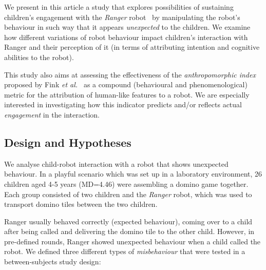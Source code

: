\documentclass{sig-alternate}
\newcommand{\etal}{{\textit{et al.~}}}
\begin{document}
We present in this article a study that explores possibilities of sustaining
children's engagement with the \emph{Ranger} robot~\cite{mondada2014ranger} by
manipulating the robot's behaviour in such way that it appears
\textit{unexpected} to the children. We examine how different variations of
robot behaviour impact children's interaction with Ranger and their perception of
it (in terms of attributing intention and cognitive abilities to the robot).

This study also aims at assessing the effectiveness of the \emph{anthropomorphic
index} proposed by Fink \etal\cite{fink2014dynamics} as a compound (behavioural
and phenomenological) metric for the attribution of human-like features to
a robot. We are especially interested in investigating how this indicator predicts
and/or reflects actual \emph{engagement} in the interaction.

\subsection{Design and Hypotheses}

We analyse child-robot interaction with a robot that shows unexpected behaviour.
In a playful scenario which was set up in a laboratory environment, 26 children
aged 4-5 years (MD=4.46) were assembling a domino game together. Each group
consisted of two children and the \emph{Ranger} robot, which was used to
transport domino tiles between the two children.

Ranger usually behaved correctly (expected behaviour), coming over to a child
after being called and delivering the domino tile to the other child. However,
in pre-defined rounds, Ranger showed unexpected behaviour when a child called the
robot. We defined three different types of \textit{misbehaviour} that were tested
in a between-subjects study design:
\end{document}
